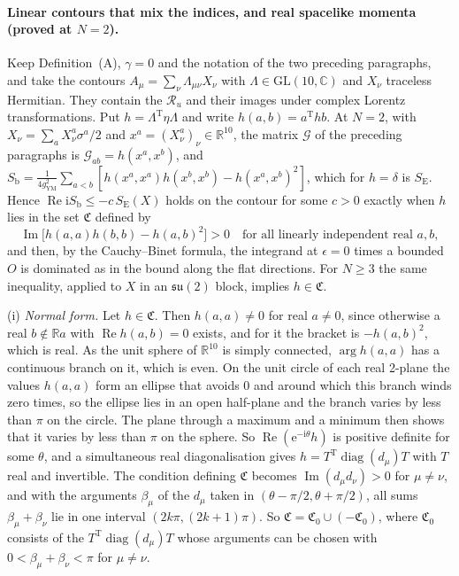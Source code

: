 \paragraph{Linear contours that mix the indices, and real spacelike momenta (proved at \(N=2\)).}
Keep Definition~(A), \(\gamma=0\) and the notation of the two preceding paragraphs, and take the contours \(A_\mu=\sum_\nu\Lambda_{\mu\nu}X_\nu\) with \(\Lambda\in\mathrm{GL}(10,\mathbb C)\) and \(X_\nu\) traceless Hermitian. They contain the \(\mathcal R_u\) and their images under complex Lorentz transformations. Put \(h=\Lambda^{\mathrm T}\eta\Lambda\) and write \(h(a,b)=a^{\mathrm T}hb\). At \(N=2\), with \(X_\nu=\sum_aX_\nu^a\sigma^a/2\) and \(x^a=(X_\nu^a)_\nu\in\mathbb R^{10}\), the matrix \(\mathcal G\) of the preceding paragraphs is \(\mathcal G_{ab}=h(x^a,x^b)\), and \(S_{\mathrm b}=\tfrac1{4g_{\mathrm{YM}}^2}\sum_{a<b}[h(x^a,x^a)h(x^b,x^b)-h(x^a,x^b)^2]\), which for \(h=\delta\) is \(S_{\mathrm E}\). Hence \(\operatorname{Re}\mathrm iS_{\mathrm b}\le-c\,S_{\mathrm E}(X)\) holds on the contour for some \(c>0\) exactly when \(h\) lies in the set \(\mathfrak C\) defined by
\[
\operatorname{Im}\bigl[h(a,a)h(b,b)-h(a,b)^2\bigr]>0\quad\text{for all linearly independent real }a,b,
\]
and then, by the Cauchy--Binet formula, the integrand at \(\epsilon=0\) times a bounded \(O\) is dominated as in the bound along the flat directions. For \(N\ge3\) the same inequality, applied to \(X\) in an \(\mathfrak{su}(2)\) block, implies \(h\in\mathfrak C\).

(i) \emph{Normal form.} Let \(h\in\mathfrak C\). Then \(h(a,a)\neq0\) for real \(a\neq0\), since otherwise a real \(b\notin\mathbb Ra\) with \(\operatorname{Re}h(a,b)=0\) exists, and for it the bracket is \(-h(a,b)^2\), which is real. As the unit sphere of \(\mathbb R^{10}\) is simply connected, \(\arg h(a,a)\) has a continuous branch on it, which is even. On the unit circle of each real 2-plane the values \(h(a,a)\) form an ellipse that avoids \(0\) and around which this branch winds zero times, so the ellipse lies in an open half-plane and the branch varies by less than \(\pi\) on the circle. The plane through a maximum and a minimum then shows that it varies by less than \(\pi\) on the sphere. So \(\operatorname{Re}(\mathrm e^{-\mathrm i\theta}h)\) is positive definite for some \(\theta\), and a simultaneous real diagonalisation gives \(h=T^{\mathrm T}\operatorname{diag}(d_\mu)T\) with \(T\) real and invertible. The condition defining \(\mathfrak C\) becomes \(\operatorname{Im}(d_\mu d_\nu)>0\) for \(\mu\neq\nu\), and with the arguments \(\beta_\mu\) of the \(d_\mu\) taken in \((\theta-\pi/2,\theta+\pi/2)\), all sums \(\beta_\mu+\beta_\nu\) lie in one interval \((2k\pi,(2k+1)\pi)\). So \(\mathfrak C=\mathfrak C_0\cup(-\mathfrak C_0)\), where \(\mathfrak C_0\) consists of the \(T^{\mathrm T}\operatorname{diag}(d_\mu)T\) whose arguments can be chosen with \(0<\beta_\mu+\beta_\nu<\pi\) for \(\mu\neq\nu\).

